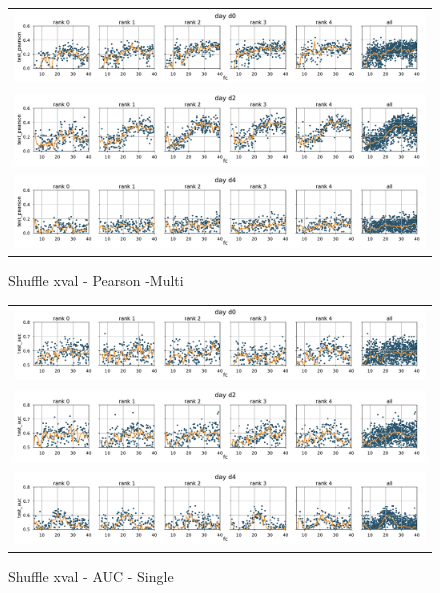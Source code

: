 \documentclass[10pt,a4paper]{article}
\begin{document}
\begin{figure}
\centering
\begin{tabular}{c}
	\includegraphics[width=\perfwidth\textwidth]{figures/par_sweep/test_pearson_fc_d0_Shuffle_Multi}\\
	\includegraphics[width=\perfwidth\textwidth]{figures/par_sweep/test_pearson_fc_d2_Shuffle_Multi}\\
	\includegraphics[width=\perfwidth\textwidth]{figures//par_sweep/test_pearson_fc_d4_Shuffle_Multi}
\end{tabular}
\caption{Shuffle xval - Pearson -Multi} 
\end{figure}

\begin{figure}
\centering
\begin{tabular}{c}
	\includegraphics[width=\perfwidth\textwidth]{figures/par_sweep/test_auc_fc_d0_Shuffle_Single}\\
	\includegraphics[width=\perfwidth\textwidth]{figures/par_sweep/test_auc_fc_d2_Shuffle_Single}\\
	\includegraphics[width=\perfwidth\textwidth]{figures//par_sweep/test_auc_fc_d4_Shuffle_Single}
\end{tabular}
\caption{Shuffle xval - AUC - Single} 
\end{figure}
\end{document}
